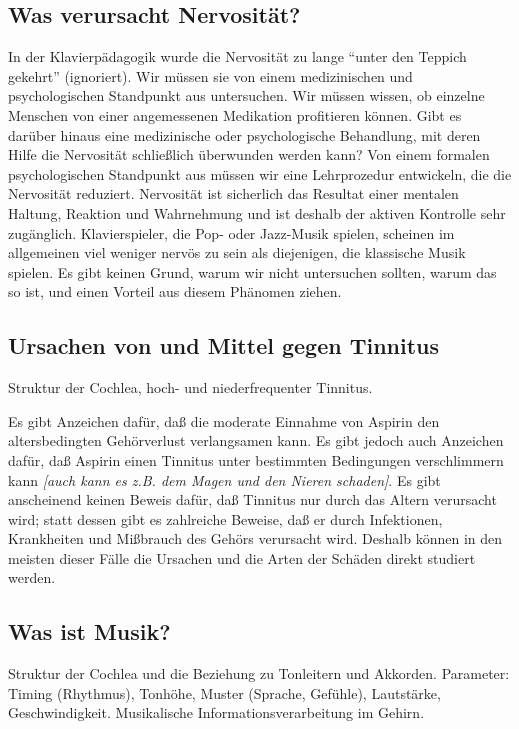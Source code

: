 \subsection{Was verursacht Nervosität?}\hypertarget{c1iv6d}{}

In der Klavierpädagogik wurde die Nervosität zu lange \enquote{unter den Teppich gekehrt} (ignoriert).
Wir müssen sie von einem medizinischen und psychologischen Standpunkt aus untersuchen.
Wir müssen wissen, ob einzelne Menschen von einer angemessenen Medikation profitieren können.
Gibt es darüber hinaus eine medizinische oder psychologische Behandlung, mit deren Hilfe die Nervosität schließlich überwunden werden kann?
Von einem formalen psychologischen Standpunkt aus müssen wir eine Lehrprozedur entwickeln, die die Nervosität reduziert.
Nervosität ist sicherlich das Resultat einer mentalen Haltung, Reaktion und Wahrnehmung und ist deshalb der aktiven Kontrolle sehr zugänglich.
Klavierspieler, die Pop- oder Jazz-Musik spielen, scheinen im allgemeinen viel weniger nervös zu sein als diejenigen, die klassische Musik spielen.
Es gibt keinen Grund, warum wir nicht untersuchen sollten, warum das so ist, und einen Vorteil aus diesem Phänomen ziehen.


\subsection{Ursachen von und Mittel gegen Tinnitus}\hypertarget{c1iv6e}{}

Struktur der Cochlea, hoch- und niederfrequenter Tinnitus.

Es gibt Anzeichen dafür, daß die moderate Einnahme von Aspirin den altersbedingten Gehörverlust verlangsamen kann.
Es gibt jedoch auch Anzeichen dafür, daß Aspirin einen Tinnitus unter bestimmten Bedingungen verschlimmern kann \textit{[auch kann es z.B. dem Magen und den Nieren schaden]}.
Es gibt anscheinend keinen Beweis dafür, daß Tinnitus nur durch das Altern verursacht wird; statt dessen gibt es zahlreiche Beweise, daß er durch Infektionen, Krankheiten und Mißbrauch des Gehörs verursacht wird.
Deshalb können in den meisten dieser Fälle die Ursachen und die Arten der Schäden direkt studiert werden.


\subsection{Was ist Musik?}\hypertarget{c1iv6f}{}

Struktur der Cochlea und die Beziehung zu Tonleitern und Akkorden.
Parameter: Timing (Rhythmus), Tonhöhe, Muster (Sprache, Gefühle), Lautstärke, Geschwindigkeit.
Musikalische Informationsverarbeitung im Gehirn.


